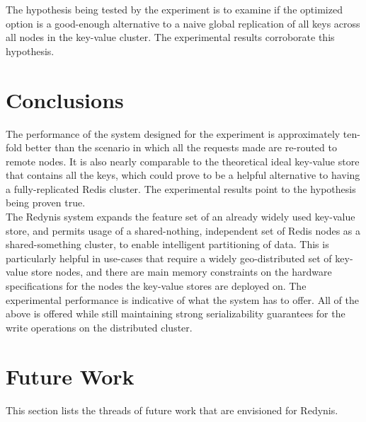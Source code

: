 \documentclass{sig-alternate}
\begin{document}
The hypothesis being tested by the experiment is to examine if the optimized option is a good-enough alternative to a naive global replication of all keys across all nodes in the key-value cluster. The experimental results corroborate this hypothesis.\\


\section{Conclusions}
The performance of the system designed for the experiment is approximately ten-fold better than the scenario in which all the requests made are re-routed to remote nodes. It is also nearly comparable to the theoretical ideal key-value store that contains all the keys, which could prove to be a helpful alternative to having a fully-replicated Redis cluster. The experimental results point to the hypothesis being proven true. \\

The Redynis system expands the feature set of an already widely used key-value store, and permits usage of a shared-nothing, independent set of Redis nodes as a shared-something cluster, to enable intelligent partitioning of data. This is particularly helpful in use-cases that require a widely geo-distributed set of key-value store nodes, and there are main memory constraints on the hardware specifications for the nodes the key-value stores are deployed on. The experimental performance is indicative of what the system has to offer. All of the above is offered while still maintaining strong serializability guarantees for the write operations on the distributed cluster.\\


\section{Future Work}
This section lists the threads of future work that are envisioned for Redynis.
\end{document}
